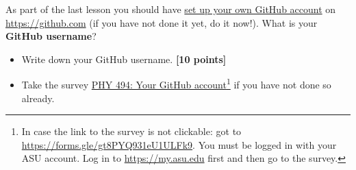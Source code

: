 \documentclass[letterpaper]{scrartcl}
\newcounter{TotalPoints}
\newcounter{TotalBonus}
\newcommand{\points}[1]{\textbf{[#1 points]}\stepcounter{TotalPoints}}
\begin{document}
As part of the last lesson you should have
\href{http://asu-compmethodsphysics-phy494.github.io/ASU-PHY494/page2/#set-up-your-own-github-repositories}{set
  up your own GitHub account} on \url{https://github.com} (if you have
not done it yet, do it now!). What is your \textbf{GitHub username}?
\begin{itemize}
\item Write down your GitHub username. \points{10}
\item Take the survey
  \href{https://forms.gle/gt8PYQ931eU1ULFk9}{PHY
    494: Your GitHub account}\footnote{In case the link to the survey
    is not clickable: got to
    \url{https://forms.gle/gt8PYQ931eU1ULFk9}. You must be logged
    in with your ASU account. Log in to \url{https://my.asu.edu} first
    and then go to the survey.} if you have not done so already.
\end{itemize}




\end{document}
